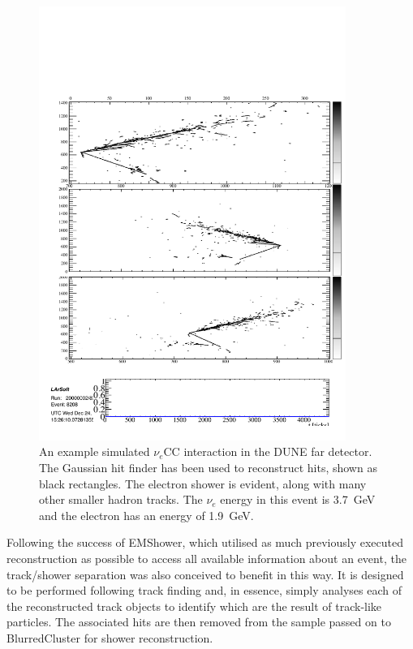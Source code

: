 \begin{figure}
  \centering
  \includegraphics[width=10cm]{NuECCHits.pdf}
  \caption[An example simulated $\nu_e$CC interaction in the DUNE far detector.]{An example simulated $\nu_e$CC interaction in the DUNE far detector.  The Gaussian hit finder has been used to reconstruct hits, shown as black rectangles.  The electron shower is evident, along with many other smaller hadron tracks.  The $\nu_e$ energy in this event is 3.7~GeV and the electron has an energy of 1.9~GeV.}
  \label{fig:nueCC}
\end{figure}

Following the success of EMShower, which utilised as much previously executed reconstruction as possible to access all available information about an event, the track/shower separation was also conceived to benefit in this way.  It is designed to be performed following track finding and, in essence, simply analyses each of the reconstructed track objects to identify which are the result of track-like particles.  The associated hits are then removed from the sample passed on to BlurredCluster for shower reconstruction.

